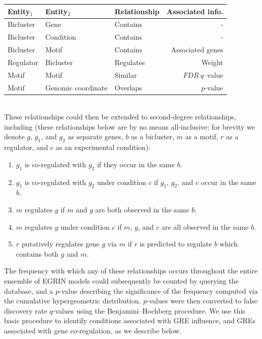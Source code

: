 \begin{tabular}{|l|l|l|r|} 
\hline
Entity$_1$        & Entity$_2$         & Relationship  & Associated info. \\ \hline
Bicluster         & Gene               & Contains      & - \\
Bicluster         & Condition          & Contains      & - \\
Bicluster         & Motif              & Contains      & Associated genes \\
Regulator         & Bicluster          & Regulates     & Weight \\
Motif             & Motif              & Similar       & $FDR\ q$--value \\
Motif             & Genomic coordinate & Overlaps      & $p$-value \\
\hline
\end{tabular}
\\

\noindent These relationships could then be extended to second-degree relationships, including (these relationships below are by no means all-inclusive; for brevity we denote $g$, $g_1$, and $g_2$ as separate genes, $b$ as a bicluster, $m$ as a motif, $r$ as a regulator, and $c$ as an experimental condition):

\begin{enumerate}
\item $g_1$ is co-regulated with $g_2$ if they occur in the same $b$.
\item $g_1$ is co-regulated with $g_2$ under condition $c$ if $g_1$, $g_2$, and $c$ occur in the same $b$.
\item $m$ regulates $g$ if $m$ and $g$ are both observed in the same $b$.
\item $m$ regulates $g$ under condition $c$ if $m$, $g$, and $c$ are all observed in the same $b$.
\item $r$ putatively regulates gene $g$ via $m$ if $r$ is predicted to regulate $b$ which contains both $g$ and $m$.
\end{enumerate}

\noindent The frequency with which any of these relationships occurs throughout the entire ensemble of EGRIN models could subsequently be counted by querying the database, and a $p$-value describing the significance of the frequency computed via the cumulative hypergeometric distribution. $p$-values were then converted to false discovery rate $q$-values using the Benjamini–Hochberg procedure.  We use this basic procedure to identify conditions associated with GRE influence, and GREs associated with gene co-regulation, as we describe below.

